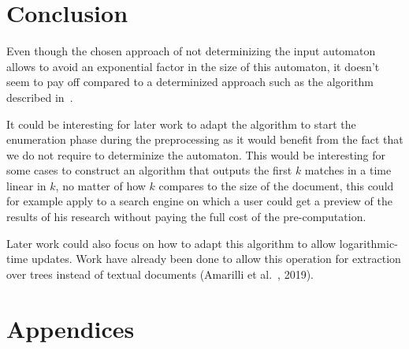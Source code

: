 \documentclass[11px]{article}
\theoremstyle{definition}
\begin{document}


  \section{Conclusion}

    Even though the chosen approach of not determinizing the input automaton
    allows to avoid an exponential factor in the size of this automaton, it
    doesn't seem to pay off compared to a determinized approach such as the
    algorithm described in~\cite{florenzano2018constant}.

    It could be interesting for later work to adapt the algorithm to start the
    enumeration phase during the preprocessing as it would benefit from the fact
    that we do not require to determinize the automaton. This would be
    interesting for some cases to construct an algorithm that outputs the first
    $k$ matches in a time linear in $k$, no matter of how $k$ compares to the
    size of the document, this could for example apply to a search engine on
    which a user could get a preview of the results of his research without
    paying the full cost of the pre-computation.

    Later work could also focus on how to adapt this algorithm to allow
    logarithmic-time updates. Work have already been done to allow this operation
    for extraction over trees instead of textual documents (Amarilli et
    al.~\cite{amarilli2019enumeration}, 2019).


  \pagebreak
  
  


  \pagebreak
  \section*{Appendices}
\end{document}
